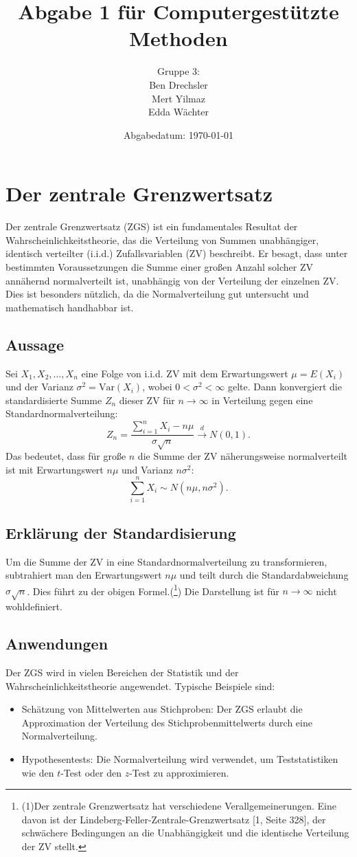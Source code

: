 \documentclass[a4paper,12pt]{article}
\title{Abgabe 1 für Computergestützte Methoden}
\author{Gruppe 3: \\ Ben Drechsler \\ Mert Yilmaz \\ Edda Wächter}
\date{Abgabedatum: \today}
\begin{document}
\maketitle

\tableofcontents
\newpage

\section{Der zentrale Grenzwertsatz}
Der zentrale Grenzwertsatz (ZGS) ist ein fundamentales Resultat der Wahrscheinlichkeitstheorie, das die Verteilung von Summen unabhängiger, identisch verteilter (i.i.d.) Zufallsvariablen (ZV) beschreibt. Er besagt, dass unter bestimmten Voraussetzungen die Summe einer großen Anzahl solcher ZV annähernd normalverteilt ist, unabhängig von der Verteilung der einzelnen ZV. Dies ist besonders nützlich, da die Normalverteilung gut untersucht und mathematisch handhabbar ist.

\subsection{Aussage}
Sei \(X_1, X_2, \dots, X_n\) eine Folge von i.i.d. ZV mit dem Erwartungswert \(\mu = E(X_i)\) und der Varianz \(\sigma^2 = \text{Var}(X_i)\), wobei \(0 < \sigma^2 < \infty\) gelte. Dann konvergiert die standardisierte Summe \(Z_n\) dieser ZV für \(n \to \infty\) in Verteilung gegen eine Standardnormalverteilung:
\[
Z_n = \frac{\sum_{i=1}^n X_i - n\mu}{\sigma \sqrt{n}} \overset{d}{\to} N(0, 1).
\]
Das bedeutet, dass für große \(n\) die Summe der ZV näherungsweise normalverteilt ist mit Erwartungswert \(n\mu\) und Varianz \(n\sigma^2\):
\[
\sum_{i=1}^n X_i \sim N(n\mu, n\sigma^2).
\]

\subsection{Erklärung der Standardisierung}
Um die Summe der ZV in eine Standardnormalverteilung zu transformieren, subtrahiert man den Erwartungswert \(n\mu\) und teilt durch die Standardabweichung \(\sigma \sqrt{n}\). Dies führt zu der obigen Formel.(\footnote{(1)Der zentrale Grenzwertsatz hat verschiedene Verallgemeinerungen. Eine davon ist der Lindeberg-Feller-Zentrale-Grenzwertsatz [1, Seite 328], der schwächere Bedingungen an die Unabhängigkeit und die identische Verteilung der ZV stellt.})
Die Darstellung ist für \(n \to \infty\) nicht wohldefiniert.

\subsection{Anwendungen}
Der ZGS wird in vielen Bereichen der Statistik und der Wahrscheinlichkeitstheorie angewendet. Typische Beispiele sind:
\begin{itemize}
    \item Schätzung von Mittelwerten aus Stichproben: Der ZGS erlaubt die Approximation der Verteilung des Stichprobenmittelwerts durch eine Normalverteilung.
    \item Hypothesentests: Die Normalverteilung wird verwendet, um Teststatistiken wie den \(t\)-Test oder den \(z\)-Test zu approximieren.
\end{itemize}
\end{document}

